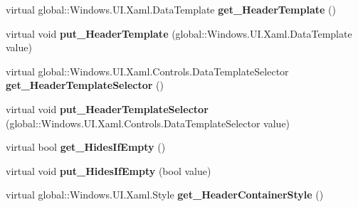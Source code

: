 \begin{DoxyCompactItemize}
\mbox{\label{class_windows_1_1_u_i_1_1_xaml_1_1_controls_1_1_group_style_af2b42ad3678973b6c5ffc2da772855d9}} 
virtual global\+::\+Windows.\+U\+I.\+Xaml.\+Data\+Template {\bfseries get\+\_\+\+Header\+Template} ()
\item 
\mbox{\label{class_windows_1_1_u_i_1_1_xaml_1_1_controls_1_1_group_style_abe3e5ea2a3be2465b15f097703102cd2}} 
virtual void {\bfseries put\+\_\+\+Header\+Template} (global\+::\+Windows.\+U\+I.\+Xaml.\+Data\+Template value)
\item 
\mbox{\label{class_windows_1_1_u_i_1_1_xaml_1_1_controls_1_1_group_style_a146db53a3fc94e4e3c9433f3c199f1ff}} 
virtual global\+::\+Windows.\+U\+I.\+Xaml.\+Controls.\+Data\+Template\+Selector {\bfseries get\+\_\+\+Header\+Template\+Selector} ()
\item 
\mbox{\label{class_windows_1_1_u_i_1_1_xaml_1_1_controls_1_1_group_style_a3b0221f01ff571dde0bf2c5bd0eeca2d}} 
virtual void {\bfseries put\+\_\+\+Header\+Template\+Selector} (global\+::\+Windows.\+U\+I.\+Xaml.\+Controls.\+Data\+Template\+Selector value)
\item 
\mbox{\label{class_windows_1_1_u_i_1_1_xaml_1_1_controls_1_1_group_style_a3b73f89d90026b986f6e55bc0566aedf}} 
virtual bool {\bfseries get\+\_\+\+Hides\+If\+Empty} ()
\item 
\mbox{\label{class_windows_1_1_u_i_1_1_xaml_1_1_controls_1_1_group_style_aa40a04f641abe85a825e92cf3eb7b442}} 
virtual void {\bfseries put\+\_\+\+Hides\+If\+Empty} (bool value)
\item 
\mbox{\label{class_windows_1_1_u_i_1_1_xaml_1_1_controls_1_1_group_style_a3c12aa3cefaa3b60dc882ca5393ec88f}} 
virtual global\+::\+Windows.\+U\+I.\+Xaml.\+Style {\bfseries get\+\_\+\+Header\+Container\+Style} ()
\item 
\mbox{\label{class_windows_1_1_u_i_1_1_xaml_1_1_controls_1_1_group_style_aab18a3e263942f9bedd80679e89e0fba}} 

\end{DoxyCompactItemize}
